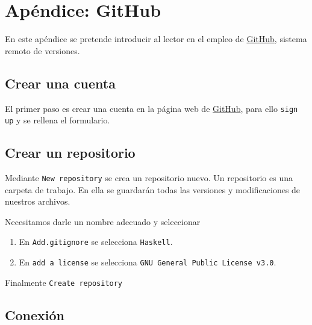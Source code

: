 \chapter{Apéndice: GitHub}
En este apéndice se pretende introducir al lector en
el empleo de \href{https://github.com/}{GitHub}, sistema remoto de versiones.
\section{Crear una cuenta}

El primer paso es crear una cuenta en la página web de \href{https://github.com/}{GitHub},
para ello \texttt{sign up} y se rellena el formulario.

\section{Crear un repositorio}

Mediante \texttt{New repository} se crea un repositorio nuevo.
Un repositorio es una carpeta de trabajo. En ella se guardarán todas
las versiones y modificaciones de nuestros archivos.

Necesitamos darle un nombre adecuado y seleccionar
\begin{enumerate}
\item En \texttt{Add.gitignore} se selecciona \texttt{Haskell}.
\item En \texttt{add a license} se selecciona \texttt{GNU General Public License v3.0}.
\end{enumerate}

Finalmente \texttt{Create repository}

\section{Conexión}

